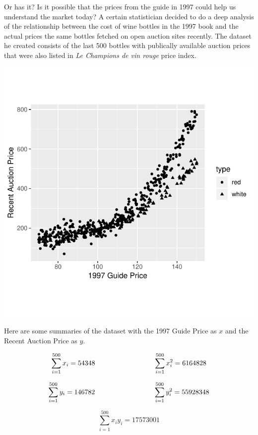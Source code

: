 \documentclass[addpoints]{examsetup}\usepackage[]{graphicx}\usepackage[]{color}
\newenvironment{knitrout}{}{} %
\begin{document}
\begin{questions}
Or has it? 
Is it possible that the prices from the guide in 1997 could help us understand the market today?
A certain statistician decided to do a deep analysis of the relationship between the cost of wine bottles in the 1997 book and the actual prices the same bottles fetched on open auction sites recently. 
The dataset he created consists of the last 500 bottles with publically available auction prices that were also listed in \textit{Le Champions de vin rouge} price index.

\begin{center}
\begin{knitrout}
\color{fgcolor}
\includegraphics[width=.5\linewidth]{figure/unnamed-chunk-13-1} 

\end{knitrout}
\end{center}

Here are some summaries of the dataset with the 1997 Guide Price as $x$ and the Recent Auction Price as $y$.

$$
\sum_{i=1}^{500} x_i = 54348 \hspace{3cm} \sum_{i=1}^{500} x_i^2 = 6164828 \\
$$

$$
\sum_{i=1}^{500} y_i = 146782 \hspace{3cm} \sum_{i=1}^{500} y_i^2 = 55928348 \\
$$

$$
\sum_{i=1}^{500} x_i y_i = 17573001
$$

\pagebreak

\begin{parts}

\end{parts}
\end{questions}
\end{document}

